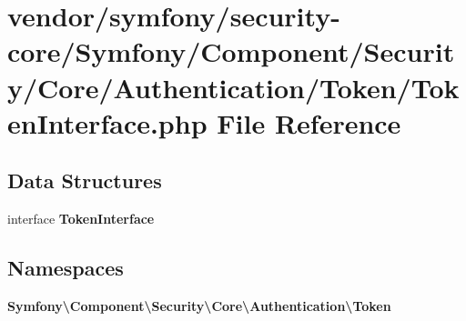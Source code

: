 \section{vendor/symfony/security-\/core/\+Symfony/\+Component/\+Security/\+Core/\+Authentication/\+Token/\+Token\+Interface.php File Reference}
\label{symfony_2security-core_2_symfony_2_component_2_security_2_core_2_authentication_2_token_2_token_interface_8php}
\subsection*{Data Structures}
\begin{DoxyCompactItemize}
\item 
interface {\bf Token\+Interface}
\end{DoxyCompactItemize}
\subsection*{Namespaces}
\begin{DoxyCompactItemize}
\item 
 {\bf Symfony\textbackslash{}\+Component\textbackslash{}\+Security\textbackslash{}\+Core\textbackslash{}\+Authentication\textbackslash{}\+Token}
\end{DoxyCompactItemize}
